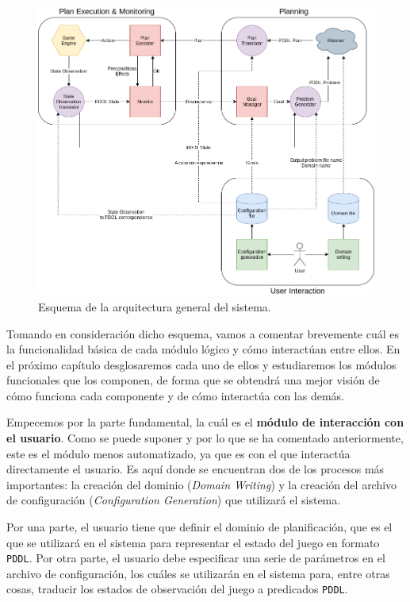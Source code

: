 \begin{figure}[H]
    \centering
    \includegraphics[scale=0.4]{img/CH04/system_arch.png}
    \caption{Esquema de la arquitectura general del sistema.}
    \label{fig:system_arch}
\end{figure}

Tomando en consideración dicho esquema, vamos a comentar brevemente cuál es
la funcionalidad básica de cada módulo lógico y cómo interactúan entre ellos.
En el próximo capítulo desglosaremos cada uno de ellos y estudiaremos los módulos
funcionales que los componen, de forma que se obtendrá una mejor visión de cómo
funciona cada componente y de cómo interactúa con las demás.

Empecemos por la parte fundamental, la cuál es el \textbf{módulo de interacción con el usuario}.
Como se puede suponer y por lo que se ha comentado anteriormente, este es el módulo
menos automatizado, ya que es con el que interactúa directamente el usuario. Es aquí
donde se encuentran dos de los procesos más importantes: la creación del dominio
(\textit{Domain Writing}) y la creación del archivo de configuración
(\textit{Configuration Generation}) que utilizará el sistema.

Por una parte, el usuario tiene que definir el dominio de planificación, que es el que se
utilizará en el sistema para representar el estado del juego en formato \texttt{PDDL}.
Por otra parte, el usuario debe especificar una serie de parámetros en el archivo de
configuración, los cuáles se utilizarán en el sistema para, entre otras cosas, traducir los
estados de observación del juego a predicados \texttt{PDDL}.

